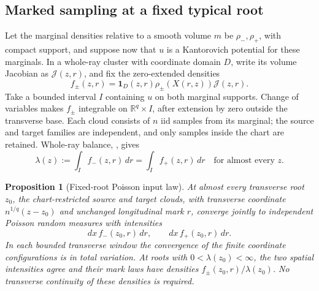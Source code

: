 \documentclass[11pt,reqno]{amsart}
\newtheorem{proposition}[theorem]{Proposition}
\theoremstyle{definition}
\theoremstyle{remark}
\numberwithin{equation}{section}
\newcommand{\R}{\mathbb R}
\begin{document}
\subsection{Marked sampling at a fixed typical root}

Let the marginal densities relative to a smooth volume \(m\) be
\(\rho_-,\rho_+\), with compact support, and suppose now that \(u\)
is a Kantorovich potential for these marginals. In a whole-ray
cluster with coordinate domain \(D\), write its volume Jacobian as
\(\mathcal J(z,r)\), and fix the zero-extended densities
\[
f_\pm(z,r)=\mathbf1_D(z,r)\rho_\pm(X(r,z))\mathcal J(z,r).
\]
Take a bounded interval \(I\) containing \(u\) on both marginal
supports. Change of variables makes \(f_\pm\) integrable on
\(\R^q\times I\), after extension by zero outside the transverse
base. Each cloud consists of \(n\) iid samples from its marginal;
the source and target families are independent, and only samples
inside the chart are retained. Whole-ray balance, \cite[Theorem~5.9]{Assouline}, gives
\[
\lambda(z):=\int_I f_-(z,r)\,dr=\int_I f_+(z,r)\,dr
\quad\text{for almost every }z.
\]

\begin{proposition}[Fixed-root Poisson input law]
\label{prop:rough-ray-poisson}
At almost every transverse root \(z_0\), the chart-restricted
source and target clouds, with transverse coordinate
\(n^{1/q}(z-z_0)\) and unchanged longitudinal mark \(r\), converge
jointly to independent Poisson random measures with intensities
\[
dx\,f_-(z_0,r)\,dr,\qquad dx\,f_+(z_0,r)\,dr.
\]
In each bounded transverse window the convergence of the finite
coordinate configurations is in total variation. At roots with
\(0<\lambda(z_0)<\infty\), the two spatial intensities agree and
their mark laws have densities \(f_\pm(z_0,r)/\lambda(z_0)\).
No transverse continuity of these densities is required.
\end{proposition}
\end{document}
